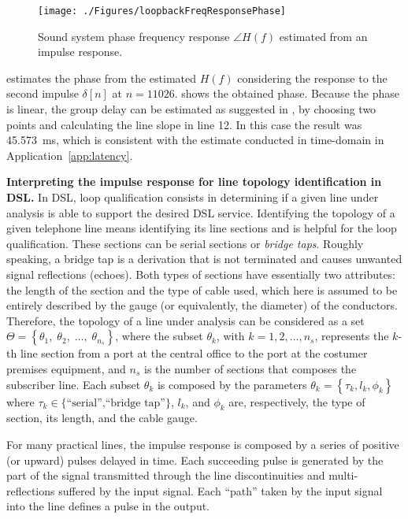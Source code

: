 \begin{figure}
\centering
\texttt{[image: ./Figures/loopbackFreqResponsePhase]}
\caption{Sound system phase frequency response $\angle{H(f)}$ estimated from an impulse response.\label{fig:loopbackFreqResponsePhase}}
\end{figure}

 estimates the phase from the estimated $H(f)$ considering the response to the second impulse $\delta[n]$ at $n=11026$.
 shows the obtained phase.
Because the phase is linear, the group delay can be estimated as suggested in
, by choosing two points and calculating the line slope in line 12.
In this case the result was 45.573~ms, which is consistent with the estimate
conducted in time-domain in Application~\ref{app:latency}.
\eApplication

\bApplication \textbf{Interpreting the impulse response for line topology identification in DSL.}
In DSL, loop qualification consists in determining if a given line under analysis is able to support the desired DSL service. Identifying the topology of a given telephone line means identifying its line sections and is helpful for the loop qualification. These sections can be serial sections or \emph{bridge taps}. Roughly speaking, a bridge tap is a derivation that is not terminated and causes unwanted signal reflections (echoes). Both types of sections have essentially two attributes: the length of the section and the type of cable used, which here is assumed to be entirely described by the gauge (or equivalently, the diameter) of the conductors. Therefore, the topology of a line under analysis can be considered as a set
$\Theta  = \left\{ {{\theta _1},\;{\theta _2},\; \ldots ,\;{\theta _{{n_s}}}} \right\}$,
where the subset $\theta_{k}$, with $k = 1, 2, ..., n_{s}$, represents the $k$-th line section from a port at the central office to the port at the costumer premises equipment, and $n_{s}$ is the number of sections that composes the subscriber line. Each subset $\theta_{k}$ is composed by the parameters
${\theta _k} = \left\{ {{\tau _k},{l_k},{\phi _k}} \right\}$
where $\tau _k \in \{\textrm{``serial'',``bridge tap''}\}$, $l_k$, and $\phi _k$ are, respectively, the type of section, its length, and the cable gauge.

For many practical lines, the impulse response is composed by a series of positive (or upward) pulses delayed in time. Each succeeding pulse is generated by the part of the signal transmitted through the line discontinuities and multi-reflections suffered by the input signal. Each ``path'' taken by the input signal into the line defines a pulse in the output.

